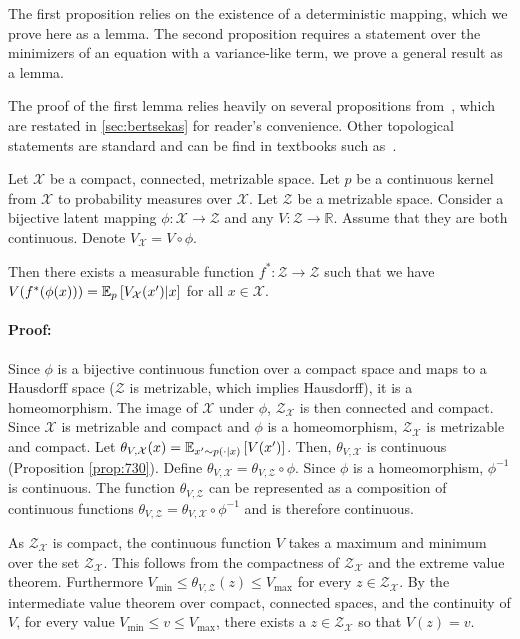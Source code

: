 \label{app:conjecture}
The first proposition relies on the existence of a deterministic mapping, which we prove here as a lemma.
The second proposition requires a statement over the minimizers of an equation with a variance-like term, we prove a general result as a lemma.

The proof of the first lemma relies heavily on several propositions from~\cite{bertsekasshreve1978}, which are restated in \autoref{sec:bertsekas} for reader's convenience.
Other topological statements are standard and can be find in textbooks such as~\cite{Munkres2018}.

\begin{lemma}
\label{lem:deterministic_representation_lemma}
    Let $\mathcal{X}$ be a compact, connected, metrizable space. Let $p$ be a continuous kernel from $\mathcal{X}$ to probability measures over $\mathcal{X}$. Let $\mathcal{Z}$ be a metrizable space. Consider a bijective latent mapping $\phi: \mathcal{X} \rightarrow \mathcal{Z}$ and any $V: \mathcal{Z} \rightarrow \mathbb{R}$. Assume that they are both continuous. Denote $V_\mathcal{X} = V \circ \phi$.
    
    Then there exists a measurable function $f^*: \mathcal{Z} \rightarrow \mathcal{Z}$ such that we have $V(f^*(\phi(x))) = \mathbb{E}_{p}\left[  V_\mathcal{X}(x')|x \right]$ for all $x \in \mathcal{X}$.
\end{lemma}

\paragraph{Proof:}
Since $\phi$ is a bijective continuous function over a compact space and maps to a Hausdorff space ($\mathcal{Z}$ is metrizable, which implies Hausdorff), it is a homeomorphism.
The image of $\mathcal{X}$ under $\phi$, $\mathcal{Z}_\mathcal{X}$ is then connected and compact.
Since $\mathcal{X}$ is metrizable and compact and $\phi$ is a homeomorphism, $\mathcal{Z}_\mathcal{X}$ is metrizable and compact.
Let $\theta_{V,\mathcal{X}}(x) = \mathbb{E}_{x' \sim p(\cdot|x)}\left[  V(x') \right]$.
Then, $\theta_{V,\mathcal{X}}$ is continuous (Proposition \autoref{prop:730}).
Define $\theta_{V, \mathcal{X}} = \theta_{V, \mathcal{Z}} \circ \phi$.
Since $\phi$ is a homeomorphism, $\phi^{-1}$ is continuous.
The function $\theta_{V, \mathcal{Z}}$ can be represented as a composition of continuous functions $\theta_{V, \mathcal{Z}} = \theta_{V, \mathcal{X}} \circ \phi^{-1}$ and is therefore continuous.

As $\mathcal{Z}_\mathcal{X}$ is compact, the continuous function $V$ takes a maximum and minimum over the set $\mathcal{Z}_\mathcal{X}$. 
This follows from the compactness of $\mathcal{Z}_\mathcal{X}$ and the extreme value theorem. 
Furthermore $V_{\min} \leq \theta_{V,\mathcal{Z}}(z) \leq V_{\max}$ for every $z \in \mathcal{Z}_\mathcal{X}$.
By the intermediate value theorem over compact, connected spaces, and the continuity of $V$, for every value $V_{\min} \leq v \leq V_{\max}$, there exists a $z \in \mathcal{Z}_\mathcal{X}$ so that $V(z) = v$.


